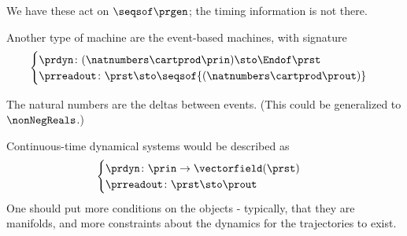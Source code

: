 We have these act on $\seqsof \prgen$; the timing information is not there.

Another type of machine are the event-based machines, with signature 
\begin{equation*}
  \begin{cases}
    \prdyn \colon (\natnumbers \cartprod \prin) \sto \Endof \prst \\
    \prreadout \colon \prst \sto \seqsof{ (\natnumbers \cartprod \prout)}
    \end{cases}    
\end{equation*}

The natural numbers are the deltas between events. (This could be generalized to $\nonNegReals$.)

Continuous-time dynamical systems would be described as 
% 
\begin{equation}
\begin{cases}
  \prdyn\colon \prin \to \vectorfield(\prst) \\
\prreadout\colon \prst \sto   \prout
\end{cases}
\end{equation}
% 
One should put more conditions on the objects - typically, that they are manifolds, and more constraints about the dynamics for the trajectories to exist.





